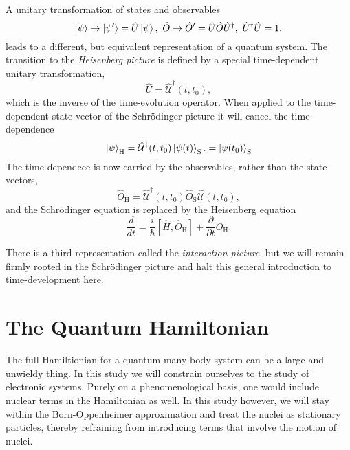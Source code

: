     A unitary transformation of states and observables
    \begin{equation}
        \ket{\psi} \to \ket{\psi'} = \hat{U}\ket{\psi}, \ 
        \hat{O} \to \hat{O}' = \hat{U}\hat{O}\hat{U}^\dagger, \ 
        \hat{U}^\dagger\hat{U} = 1.
    \end{equation}
    leads to a different, but equivalent representation of a quantum system.
    The transition to the \emph{Heisenberg picture} is defined by a special
    time-dependent unitary transformation,
    \begin{equation}
        \hat{U} = \hat{\mathcal{U}}^\dagger(t, t_0),
    \end{equation}
    which is the inverse of the time-evolution operator. When applied to the 
    time-dependent state vector of the Schrödinger picture it will cancel 
    the time-dependence
    \begin{equation}
        \ket{\psi}_\text{H} 
        = \hat{\mathcal{U}}^\dagger(t, t_0) \ket{\psi(t)}_\text{S}. 
        = \ket{\psi(t_0)}_\text{S}
    \end{equation}
    The time-dependece is now carried by the observables, rather than the state 
    vectors,
    \begin{equation}
        \hat{O}_\text{H} 
        = \hat{\mathcal{U}}^\dagger(t, t_0)
        \hat{O}_\text{S}
        \hat{\mathcal{U}}(t, t_0),
    \end{equation}
    and the Schrödinger equation is replaced by the Heisenberg equation
    \begin{equation}
        \frac{d}{dt} 
        = \frac{i}{\hbar}[\hat{H}, \hat{O}_\text{H}]
        + \frac{\partial}{\partial t} \hat{O}_\text{H}.
    \end{equation}

    There is a third representation called the \emph{interaction picture}, but we will 
    remain firmly rooted in the Schrödinger picture and halt this general introduction 
    to time-development here. 

\section{The Quantum Hamiltonian}

    The full Hamiltionian for a quantum many-body system can be a large 
    and unwieldy thing. In this study we will constrain ourselves to the study of
    electronic systems. Purely on a phenomenological basis, one would include nuclear
    terms in the Hamiltonian as well. In this study however, we will stay within the
    Born-Oppenheimer approximation and treat the nuclei as stationary particles, thereby
    refraining from introducing terms that involve the motion of nuclei.

